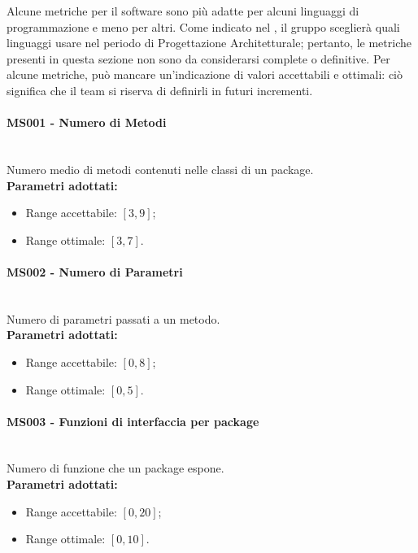 Alcune metriche per il software sono più adatte per alcuni linguaggi di programmazione e meno per altri. Come indicato nel \PdP , il gruppo \gruppo \space sceglierà quali linguaggi usare nel periodo di Progettazione Architetturale; pertanto, le metriche presenti in questa sezione non sono da considerarsi complete o definitive.\newline
Per alcune metriche, può mancare un'indicazione di valori accettabili e ottimali: ciò significa che il team si riserva di definirli in futuri incrementi.

\paragraph{MS001 - Numero di Metodi}\mbox{}\\[0,3cm]
Numero medio di metodi contenuti nelle classi di un package. \\[0,2cm]
\textbf{Parametri adottati:}
\begin{itemize}
	\item Range accettabile: $[3,9]$;
	\item Range ottimale: $[3,7]$.
\end{itemize}

\paragraph{MS002 - Numero di Parametri}\mbox{}\\[0,3cm]
Numero di parametri passati a un metodo. \\[0,2cm]
\textbf{Parametri adottati:}
\begin{itemize}
	\item Range accettabile: $[0,8]$;
	\item Range ottimale: $[0,5]$.
\end{itemize}

\paragraph{MS003 - Funzioni di interfaccia per package}\mbox{}\\[0,3cm]
Numero di funzione che un package espone. \\[0,2cm]
\textbf{Parametri adottati:}
\begin{itemize}
	\item Range accettabile: $[0,20]$;
	\item Range ottimale: $[0,10]$.
\end{itemize}

